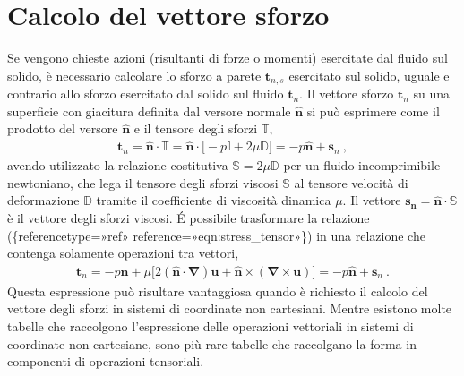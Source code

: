\documentclass[letterpaper,10pt,italian]{jupyterBook}
\begin{document}
\section{Calcolo del vettore sforzo}
\label{\detokenize{polimi/fluidmechanics-ita/template/capitoli/06_slnEsatte/0600in:calcolo-del-vettore-sforzo}}
\sphinxAtStartPar
Se vengono chieste azioni (risultanti di forze o momenti) esercitate dal
fluido sul solido, è necessario calcolare lo sforzo a parete
\(\mathbf{t}_{n,s}\) esercitato sul solido, uguale e contrario allo sforzo
esercitato dal solido sul fluido \(\mathbf{t}_{n}\). Il vettore sforzo
\(\mathbf{t}_n\) su una superficie con giacitura definita dal versore normale
\(\mathbf{\hat{n}}\) si può esprimere come il prodotto del versore
\(\mathbf{\hat{n}}\) e il tensore degli sforzi \(\mathbb{T}\),
\begin{equation*}
\begin{split}\label{eqn:stress_tensor}
 \mathbf{t}_n = \mathbf{\hat{n}} \cdot \mathbb{T} =
 \mathbf{\hat{n}} \cdot \big[-p\mathbb{I} + 2\mu\mathbb{D} \big] = 
  - p\mathbf{\hat{n}} + \mathbf{s}_n \ ,\end{split}
\end{equation*}
\sphinxAtStartPar
avendo utilizzato la relazione costitutiva
\(\mathbb{S} = 2 \mu \mathbb{D}\) per un fluido incomprimibile newtoniano,
che lega il tensore degli sforzi viscosi \(\mathbb{S}\) al tensore
velocità di deformazione \(\mathbb{D}\) tramite il coefficiente di
viscosità dinamica \(\mu\). Il vettore
\(\mathbf{s_n} = \mathbf{\hat{n}} \cdot \mathbb{S}\) è il vettore degli sforzi
viscosi. É possibile trasformare la relazione
(\{reference\sphinxhyphen{}type=»ref»
reference=»eqn:stress\_tensor»\}) in una relazione che contenga solamente
operazioni tra vettori,
\begin{equation*}
\begin{split}\label{eqn:stress_vector}
 \mathbf{t}_n = -p \mathbf{\hat{n}} +
 \mu \big[2 (\mathbf{\hat{n}} \cdot \mathbf{\nabla}) \mathbf{u} +
  \mathbf{\hat{n}} \times (\mathbf{\nabla} \times \mathbf{u}) \big]  = 
  - p\mathbf{\hat{n}} + \mathbf{s}_n \ .\end{split}
\end{equation*}
\sphinxAtStartPar
Questa espressione può risultare vantaggiosa quando è richiesto il
calcolo del vettore degli sforzi in sistemi di coordinate non
cartesiani. Mentre esistono molte tabelle che raccolgono l’espressione
delle operazioni vettoriali in sistemi di coordinate non cartesiane,
sono più rare tabelle che raccolgano la forma in componenti di
operazioni tensoriali.
\end{document}
